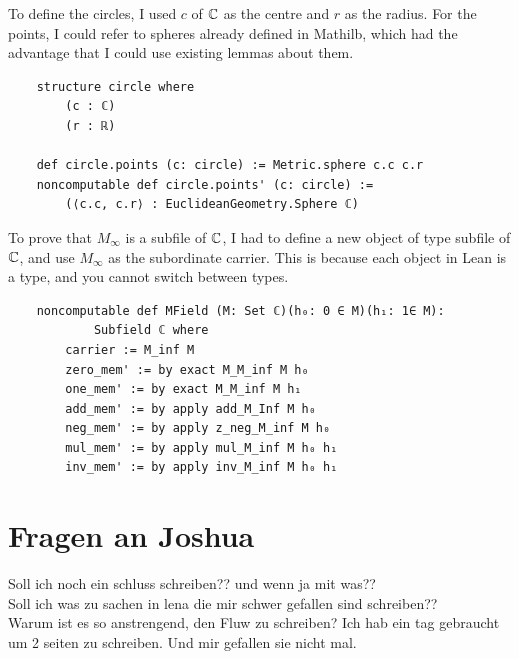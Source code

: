 To define the circles, I used $c$ of $\mathbb{C}$ as the centre and $r$ as the radius. 
For the points, I could refer to spheres already defined in Mathilb, which had the advantage that I could use existing lemmas about them. 
\begin{lstlisting}
    structure circle where
        (c : ℂ)
        (r : ℝ)

    def circle.points (c: circle) := Metric.sphere c.c c.r
    noncomputable def circle.points' (c: circle) := 
        (⟨c.c, c.r⟩ : EuclideanGeometry.Sphere ℂ)
\end{lstlisting}

To prove that $M_{\infty}$ is a subfile of $\mathbb{C}$, I had to define a new object of type subfile of $\mathbb{C}$, and use $M_{\infty}$ as the subordinate carrier.
This is because each object in Lean is a type, and you cannot switch between types.
\begin{lstlisting}
    noncomputable def MField (M: Set ℂ)(h₀: 0 ∈ M)(h₁: 1∈ M):
            Subfield ℂ where
        carrier := M_inf M
        zero_mem' := by exact M_M_inf M h₀
        one_mem' := by exact M_M_inf M h₁
        add_mem' := by apply add_M_Inf M h₀
        neg_mem' := by apply z_neg_M_inf M h₀
        mul_mem' := by apply mul_M_inf M h₀ h₁
        inv_mem' := by apply inv_M_inf M h₀ h₁
\end{lstlisting}

\section{Fragen an Joshua}
Soll ich noch ein schluss schreiben?? und wenn ja mit was??\\
Soll ich was zu sachen in lena die mir schwer gefallen sind schreiben??\\
Warum ist es so anstrengend, den Fluw zu schreiben? Ich hab ein tag gebraucht um 2 seiten zu schreiben. Und mir gefallen sie nicht mal.